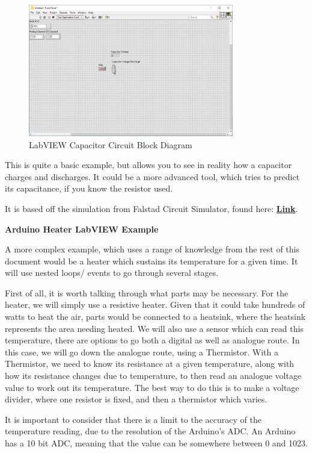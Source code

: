 \documentclass[a4paper,11pt]{report}
\let\oldhref\href %
\renewcommand{\href}[2]{\oldhref{#1}{\bfseries#2}}
\begin{document}
\begin{figure}[H]
\centering
\includegraphics[width=0.8\textwidth]{screenshots/labviewcap7}
\caption{LabVIEW Capacitor Circuit Block Diagram}
\end{figure}

This is quite a basic example, but allows you to see in reality how a capacitor charges and discharges. It could be a more advanced tool, which tries to predict its capacitance, if you know the resistor used.

It is based off the simulation from Falstad Circuit Simulator, found here: \href{https://tinyurl.com/2jjwc34l}{Link}.

\textbf{Arduino Heater LabVIEW Example}

A more complex example, which uses a range of knowledge from the rest of this document would be a heater which sustains its temperature for a given time. It will use nested loops/ events to go through several stages.

First of all, it is worth talking through what parts may be necessary. For the heater, we will simply use a resistive heater. Given that it could take hundreds of watts to heat the air, parts would be connected to a heatsink, where the heatsink represents the area needing heated. We will also use a sensor which can read this temperature, there are options to go both a digital as well as analogue route. In this case, we will go down the analogue route, using a Thermistor. With a Thermistor, we need to know its resistance at a given temperature, along with how its resistance changes due to temperature, to then read an analogue voltage value to work out its temperature. The best way to do this is to make a voltage divider, where one resistor is fixed, and then a thermistor which varies.

It is important to consider that there is a limit to the accuracy of the temperature reading, due to the resolution of the Arduino's ADC. An Arduino has a 10 bit ADC, meaning that the value can be somewhere between 0 and 1023.
\end{document}
